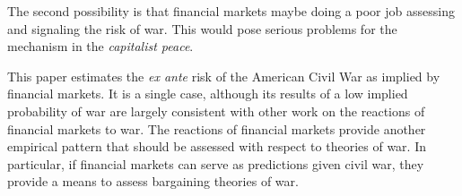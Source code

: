 \documentclass[11pt, oneside, article]{memoir}\usepackage[]{graphicx}\usepackage[]{color}
\begin{document}
The second possibility is that financial markets maybe doing a poor job assessing and signaling the risk of war.
This would pose serious problems for the mechanism in the \textit{capitalist peace}.

This paper estimates the \textit{ex ante} risk of the American Civil War as implied by financial markets.
It is a single case, although its results of a low implied probability of war are largely consistent with other work on the reactions of financial markets to war.
The reactions of financial markets provide another empirical pattern that should be assessed with respect to theories of war.
In particular, if financial markets can serve as predictions given civil war, they provide a means to assess bargaining theories of war.

\newpage


\printbibliography{}
\end{document}
